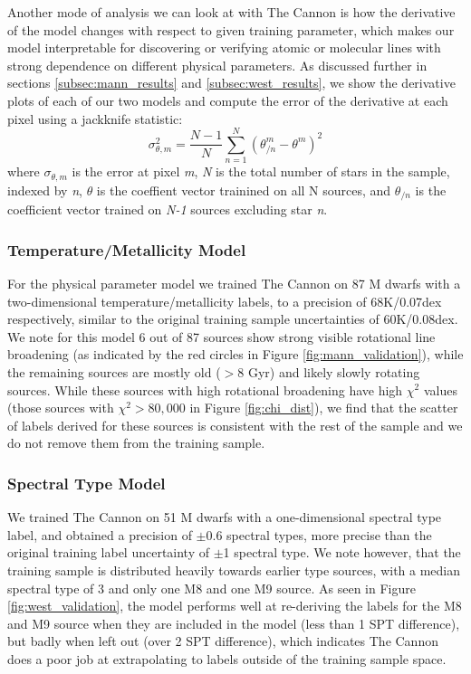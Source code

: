 \documentclass[preprint]{aastex62}
\begin{document}
Another mode of analysis we can look at with The Cannon is how the derivative of the model changes with respect to given training parameter, which makes our model interpretable for discovering or verifying atomic or molecular lines with strong dependence on different physical parameters. As discussed further in sections \ref{subsec:mann_results} and \ref{subsec:west_results}, we show the derivative plots of each of our two models and compute the error of the derivative at each pixel using a jackknife statistic:
\begin{equation}
	\sigma_{\theta,m}^2 = \frac{N-1}{N} \sum^N_{n=1} (\theta_{/n}^m - \theta^m)^2 
\end{equation}
where $\sigma_{\theta,m}$ is the error at pixel \emph{m}, \emph{N} is the total number of stars in the sample, indexed by \emph{n}, $\theta$ is the coeffient vector trainined on all N sources, and $\theta_{/n}$ is the coefficient vector trained on \emph{N-1} sources excluding star \emph{n}.


\subsubsection{Temperature/Metallicity Model \label{subsec:mann_results}}
For the physical parameter model we trained The Cannon on 87 M dwarfs with a two-dimensional temperature/metallicity labels, to a precision of 68K/0.07dex respectively, similar to the original training sample uncertainties of 60K/0.08dex. We note for this model 6 out of 87 sources show strong visible rotational line broadening (as indicated by the red circles in Figure \ref{fig:mann_validation}), while the remaining sources are mostly old ($>8$ Gyr) and likely slowly rotating sources. While these sources with high rotational broadening have high $\chi^2$ values (those sources with $\chi^2 > 80,000$ in Figure \ref{fig:chi_dist}), we find that the scatter of labels derived for these sources is consistent with the rest of the sample and we do not remove them from the training sample.

\color{gcolor}{Some note on what lines vary significantly with parameter...}\color{black}

\color{gcolor}{HOGG: Some commentary on why $\chi^2$ is higher than expected.}\color{black}

\subsubsection{Spectral Type Model \label{subsec:west_results}}
We trained The Cannon on 51 M dwarfs with a one-dimensional spectral type label, and obtained a precision of $\pm$0.6 spectral types, more precise than the original training label uncertainty of $\pm$1 spectral type. We note however, that the training sample is distributed heavily towards earlier type sources, with a median spectral type of 3 and only one M8 and one M9 source. As seen in Figure \ref{fig:west_validation}, the model performs well at re-deriving the labels for the M8 and M9 source when they are included in the model (less than 1 SPT difference), but badly when left out (over 2 SPT difference), which indicates The Cannon does a poor job at extrapolating to labels outside of the training sample space. 
\end{document}
